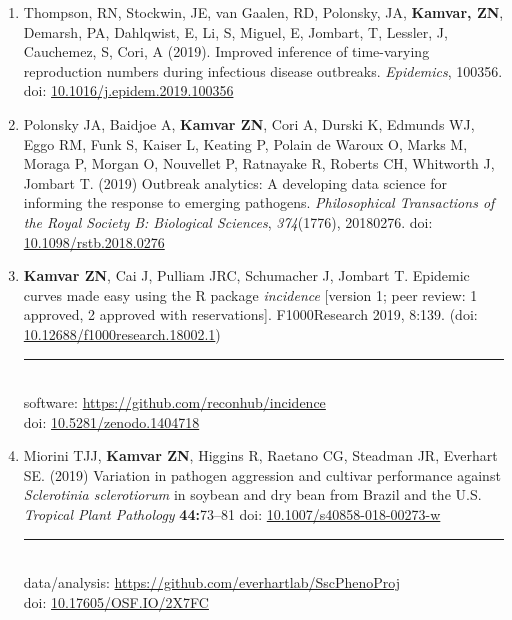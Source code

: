 \begin{enumerate}[leftmargin = 14pt]

  \item Thompson, RN, Stockwin, JE, van Gaalen, RD, Polonsky, JA,
    \textbf{Kamvar, ZN}, Demarsh, PA, Dahlqwist, E, Li, S, Miguel, E, Jombart,
    T, Lessler, J, Cauchemez, S, Cori, A (2019). Improved inference of
    time-varying reproduction numbers during infectious disease outbreaks.
    \textit{Epidemics}, 100356. 
  doi: \href{https://doi.org/10.1016/j.epidem.2019.100356}{10.1016/j.epidem.2019.100356}

	\vspace{3pt}
  
  \item Polonsky JA, Baidjoe A, \textbf{Kamvar ZN}, Cori A, Durski K, Edmunds
    WJ, Eggo RM, Funk S, Kaiser L, Keating P, Polain de Waroux O, Marks M,
    Moraga P, Morgan O, Nouvellet P, Ratnayake R, Roberts CH, Whitworth J,
    Jombart T.  (2019) Outbreak analytics: A developing data science for
    informing the response to emerging pathogens. \textit{Philosophical
    Transactions of the Royal Society B: Biological Sciences},
    \textit{374}(1776), 20180276. 
  doi: \href{https://doi.org/10.1098/rstb.2018.0276}{10.1098/rstb.2018.0276}

	\vspace{3pt}
  
  \item \textbf{Kamvar ZN}, Cai J, Pulliam JRC, Schumacher J, Jombart T.
    Epidemic curves made easy using the R package \textit{incidence} [version
    1; peer review: 1 approved, 2 approved with reservations]. F1000Research 2019, 8:139. (doi:
    \href{https://doi.org/10.12688/f1000research.18002.1}{10.12688/f1000research.18002.1})\\
	\rule[0.25\baselineskip]{0.25\textwidth}{0.5pt}\\
  software: \href{https://github.com/reconhub/incidence#readme}{https://github.com/reconhub/incidence}\\
  doi:\phantom{ware:} \href{https://doi.org/10.5281/zenodo.1404718}{10.5281/zenodo.1404718}

	\vspace{3pt}
  
  \item Miorini TJJ, \textbf{Kamvar ZN}, Higgins R, Raetano CG, Steadman JR,
    Everhart SE. (2019) Variation in pathogen aggression and cultivar
    performance against \textit{Sclerotinia sclerotiorum} in soybean and dry
    bean from Brazil and the U.S. \textit{Tropical Plant Pathology} \textbf{44:}73--81 doi:
    \href{https://doi.org/10.1007/s40858-018-00273-w}{10.1007/s40858-018-00273-w}\\
	\rule[0.25\baselineskip]{0.25\textwidth}{0.5pt}\\
  data/analysis: \href{https://github.com/everhartlab/SscPhenoProj#readme}{https://github.com/everhartlab/SscPhenoProj}\\
  doi:\phantom{t/analysis:} \href{https://doi.org/10.17605/OSF.IO/2X7FC}{10.17605/OSF.IO/2X7FC} 


\end{enumerate}

